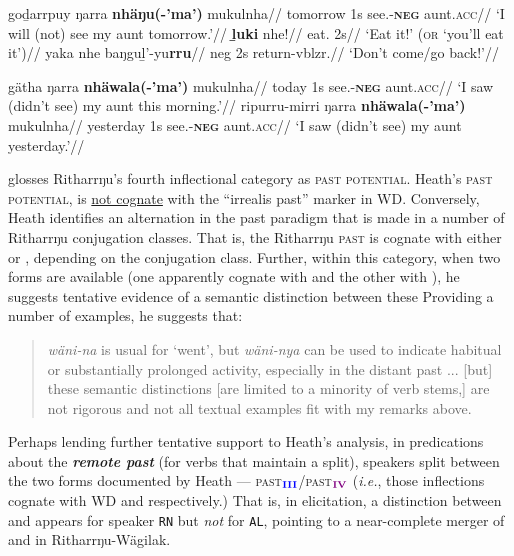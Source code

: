 \pex\a\begingl\gla {}goḏarrpuy ŋarra \textbf{nhäŋu(-'ma')} mukulnha//
\glb tomorrow 1s see.\II-\textsc{\textbf{neg}} aunt.\textsc{acc}//
\glft`I will (not) see my aunt tomorrow.'\trailingcitation{[DW~20190522]}//\endgl
\a\begingl\gla \textbf{ḻuki} nhe!//
\glb eat.\II{} 2s//
\glft`Eat it!' (\textsc{or} `you'll eat it')//\endgl
\a\begingl\gla yaka nhe baŋguḻ'-yu\textbf{rru}//
\glb \gls{neg} 2s return-\gls{vblzr}.\II//
\glft`Don't come/go back!'//\endgl
\xe

\pex\a\begingl\gla {}gätha ŋarra \textbf{nhäwala}\textbf{(-'ma')} mukulnha//
\glb today 1s see.\textbf{\III}{-\textsc{\textbf{neg}}} aunt.\textsc{acc}//
\glft`I saw (didn't see) my aunt this morning.'\trailingcitation{[RN~20190522]}//\endgl
\a\begingl\gla {}ripurru-mirri ŋarra \textbf{nhäwala}{\textbf{(-'ma')}} mukulnha//
\glb yesterday 1s see.\textbf{\III}{-\textsc{\textbf{neg}}} aunt.\textsc{acc}//
\glft`I saw (didn't see) my aunt yesterday.'\trailingcitation{[RN~20190522]}//\endgl{}
\xe


\citet[74-5]{Heath1980r} glosses Ritharrŋu's fourth inflectional category as \textsc{past potential}. Heath's \textsc{past potential}, is \ul{not cognate} with the ``irrealis past'' marker \IV{} in WD. Conversely, Heath identifies an alternation in the past paradigm that is made in a number of Ritharrŋu conjugation classes. That is, the Ritharrŋu \textsc{past} is cognate with either \III{} or \IV{}, depending on the conjugation class. Further, within this category, when two forms are available (one apparently cognate with \III{} and the other with \IV{}), he suggests tentative evidence of a semantic distinction between these 
 Providing a number of examples, he suggests that:
\begin{quote} \textit{wäni-na} is usual for `went', but \textit{wäni-nya} can be used to indicate habitual or substantially prolonged activity, especially in the distant past ... [but] these semantic distinctions [are limited to a minority of verb stems,] are not rigorous and not all textual examples fit with my remarks above.
\end{quote}

Perhaps lending further tentative support to Heath's analysis, in predications about the \textbf{\textit{remote past}} (for verbs that maintain a split), speakers split between the two forms documented by Heath --- \textsc{past$ _{\textbf{\textcolor{blue}{III}}} $/past$ _{\textbf{\textcolor{violet}{IV}}} $} (\textit{i.e.}, those inflections cognate with WD \III{} and \IV{} respectively.) That is, in elicitation, a distinction between \III{} and \IV{} appears for speaker \texttt{RN} but \textit{not} for \texttt{AL}, pointing to a near-complete merger of \III{} and \IV{} in Ritharrŋu-Wägilak.

